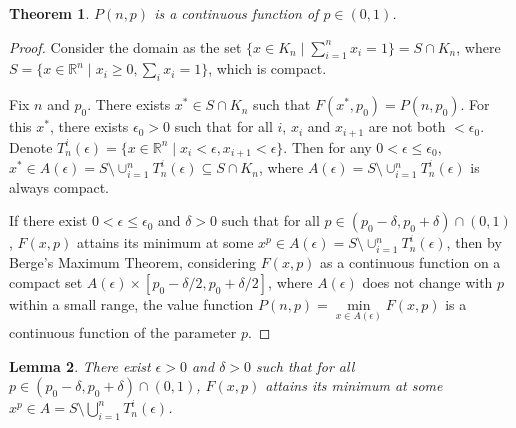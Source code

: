 \documentclass[a4paper,fleqn,numbers]{cas-sc}
\newtheorem{theorem}{Theorem}[section]
\newtheorem{lemma}[theorem]{Lemma}
\begin{document}
	\begin{theorem}
		$P(n,p)$ is a continuous function of $p \in (0,1)$.
	\end{theorem}
	
	\begin{proof}
		Consider the domain as the set \(\{ x \in K_n \mid \sum_{i=1}^n x_i = 1 \}=S\cap K_n\), where $S= \{ x \in \mathbb{R}^n \mid x_i \geq 0, \sum_i x_i = 1 \}$, which is compact.
		
		Fix $n$ and $p_0$. There exists $x^*\in S\cap K_n$ such that $F(x^*,p_0)=P(n,p_0)$. For this $x^*$, there exists $\epsilon_0 >0$ such that for all $i$, $x_i$ and $x_{i+1}$ are not both $<\epsilon_0$. Denote $T_n^i(\epsilon)=\{x\in \mathbb{R}^n\mid x_i <\epsilon,x_{i+1}<\epsilon\}$. Then for any $0<\epsilon \leq \epsilon_0$, $x^*\in A(\epsilon)=S\setminus\cup_{i=1}^n T_n^i(\epsilon)\subseteq S\cap K_n$, where $A(\epsilon)=S\setminus\cup_{i=1}^n T_n^i(\epsilon)$ is always compact.
		
		If there exist $0<\epsilon\leq\epsilon_0$ and $\delta > 0$ such that for all $p\in (p_0 -\delta,p_0 +\delta)\cap (0,1)$, $F(x,p)$ attains its minimum at some $x^p \in A(\epsilon)=S\setminus\cup_{i=1}^n T_n^i(\epsilon)$, then by Berge's Maximum Theorem, considering $F(x,p)$ as a continuous function on a compact set $ A(\epsilon) \times [p_0 - \delta/2 , p_0 + \delta/2] $, where $A(\epsilon)$ does not change with $p$ within a small range, the value function $P(n,p) = \min\limits_{x \in A(\epsilon)} F(x, p)$ is a continuous function of the parameter $p$.
	\end{proof}
	
	\begin{lemma}
		There exist $\epsilon>0$ and $\delta > 0$ such that for all $p\in (p_0 -\delta,p_0 +\delta)\cap (0,1)$, $F(x,p)$ attains its minimum at some $x^p \in A=S\setminus\bigcup_{i=1}^n T_n^i(\epsilon)$.
	\end{lemma}
	
\end{document}
